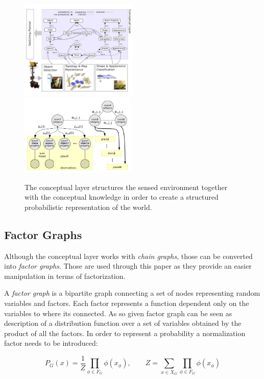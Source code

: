 \documentclass[runningheads,a4paper]{llncs}
\begin{document}
\begin{figure}[h]
\centering

\includegraphics[width=0.50\textwidth]{figures/conceptual-layer.jpg}
\includegraphics[width=0.49\textwidth]{figures/chain-graph.png}
\caption{The conceptual layer structures the sensed environment together with the conceptual knowledge
         in order to create a structured probabilistic representation of the world.}
\end{figure}

\subsection{Factor Graphs}
Although the conceptual layer works with \emph{chain graphs}, those can be converted
into \emph{factor graphs}. Those are used through this paper as they provide an
easier manipulation in terms of factorization.

A \emph{factor graph} is a bipartite graph connecting a set of nodes representing
random variables and factors.
Each factor represents a function dependent only on the variables to where its connected.
As so given factor graph can be seen as description of a distribution function over a set
of variables obtained by the product of all the factors. In order to represent a probability
a normalization factor needs to be introduced:

\begin{equation}
P_G(x) = \frac{1}{Z}\prod_{\phi \in F_G}{\phi(x_{\phi})},\qquad
Z = \sum_{x \in X_G}\prod_{\phi \in F_G}{\phi(x_{\phi})}
\end{equation}
\end{document}
